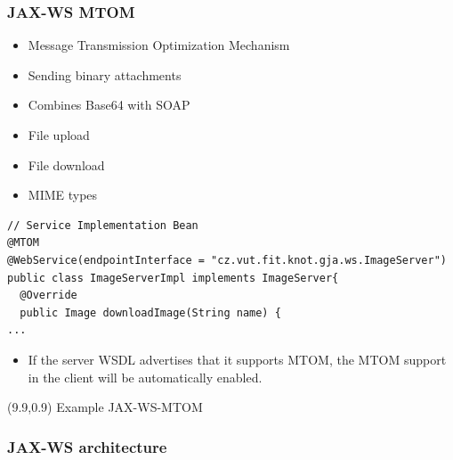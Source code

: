 \documentclass[10pt,xcolor=pdflatex]{beamer}
\begin{document}
\begin{frame}[containsverbatim]\frametitle{JAX-WS MTOM}
\begin{itemize}
	\item Message Transmission Optimization Mechanism
	\item Sending binary attachments
	\item Combines Base64 with SOAP
	\item File upload
	\item File download
	\item MIME types
\end{itemize}
\begin{footnotesize}
\begin{verbatim}
// Service Implementation Bean
@MTOM
@WebService(endpointInterface = "cz.vut.fit.knot.gja.ws.ImageServer")
public class ImageServerImpl implements ImageServer{
  @Override
  public Image downloadImage(String name) {
...
\end{verbatim}
\begin{itemize}
  \item If the server WSDL advertises that it supports MTOM, the MTOM support in the client will be automatically enabled.
\end{itemize}
\end{footnotesize}
\begin{textblock}{5}(9.9,0.9)
    {\footnotesize Example JAX-WS-MTOM}
\end{textblock}
\end{frame}


\begin{frame}[containsverbatim]\frametitle{JAX-WS architecture}
\end{frame}
\end{document}
